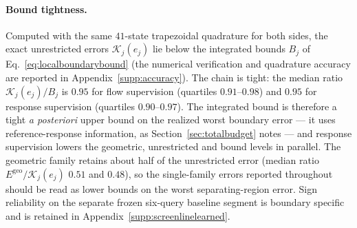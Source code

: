 \paragraph{Bound tightness.}
Computed with the same $41$-state trapezoidal quadrature for both
sides, the exact unrestricted errors $\mathcal K_j(e_j)$ lie below the
integrated bounds $B_j$ of Eq.~\eqref{eq:localboundarybound} (the
numerical verification and quadrature accuracy are reported in
Appendix~\ref{supp:accuracy}). The chain is tight: the median ratio
$\mathcal K_j(e_j)/B_j$ is $0.95$ for flow supervision (quartiles
$0.91$--$0.98$) and $0.95$ for response supervision (quartiles
$0.90$--$0.97$). The integrated bound is therefore a tight
\emph{a posteriori} upper bound on the realized worst boundary error
--- it uses reference-response information, as
Section~\ref{sec:totalbudget} notes --- and response supervision lowers
the geometric, unrestricted and bound levels in parallel. The
geometric family retains about half of the unrestricted error (median
ratio $E^{\mathrm{geo}}/\mathcal K_j(e_j)$ $0.51$ and $0.48$), so the
single-family errors reported throughout should be read as lower
bounds on the worst separating-region error. Sign reliability on the
separate frozen six-query baseline segment is boundary specific and is
retained in Appendix~\ref{supp:screenlinelearned}.
